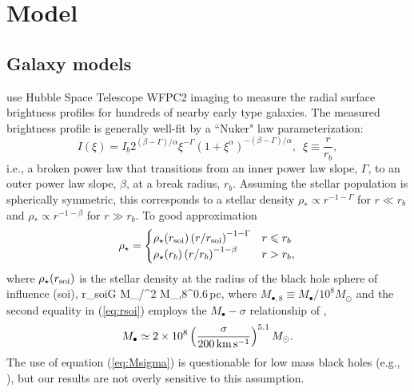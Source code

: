 \documentclass[usenatbib,fleqn]{mn2e}
\newcommand{\rb}{r_b}
\newcommand{\rhostar}{\rho_*}
\newcommand{\Mbh}[1][]{M_{\bullet#1}}
\newcommand{\soi}{\rm soi}
\newcommand{\rsoi}{r_{\soi}}
\begin{document}
\section{Model}
\label{sec:model}
\subsection{Galaxy models}
\citet{LauerFaber+:2007a} use Hubble Space Telescope WFPC2 imaging to measure the radial surface brightness profiles for hundreds of nearby early type galaxies. The measured brightness profile is generally well-fit by a ``Nuker" law parameterization:
\begin{equation}
  I(\xi)=I_b 2^{(\beta-\Gamma)/\alpha} \xi^{-\Gamma} (1+\xi^\alpha)^{-(\beta-\Gamma)/\alpha}, \,\,\,\xi\equiv\frac{r}{r_b},
\end{equation}
i.e., a broken power law that transitions from an inner power law slope, $\Gamma$, to an outer power law slope, $\beta$, at a break radius, $\rb$.  Assuming the stellar population is spherically symmetric, this corresponds to a stellar density $\rhostar \propto r^{-1-\Gamma}$ for $r \ll \rb$ and $\rhostar\propto r^{-1-\beta}$ for $r \gg \rb$.  To good approximation
\begin{align}
\rho_\star = 
\begin{cases}
\rho_\star(\rsoi) \left(r/\rsoi\right)^{-1-\Gamma} & r \leq r_b\\
\rho_\star(r_b) \left(r/r_b\right)^{-1-\beta} & r > r_b,
\label{eq:rhostar}
\end{cases}
\end{align}
where $\rho_\star(\rsoi)$ is the stellar density at the radius of the black hole sphere of influence (soi), 
\be
\rsoi \simeq G \Mbh/\sigma^2  M_{\bullet,8}^{0.6}\,{\rm pc},
\label{eq:rsoi}
\ee
where $M_{\bullet,8} \equiv M_{\bullet}/10^{8}M_{\odot}$ and the second equality in (\ref{eq:rsoi}) employs the $\Mbh-\sigma$ relationship of \citet{Gultekin+09},
 \begin{align}
M_{\bullet} \simeq 2\times 10^{8}\left(\frac{\sigma}{200\,{\rm
      km\,s^{-1}}}\right)^{5.1}M_{\odot}.
\label{eq:Msigma}
\end{align}
The use of equation (\ref{eq:Msigma}) is questionable for low mass black holes (e.g., \citealt{Greene&Ho07}), but our results are not overly sensitive to this assumption.  
\end{document}
